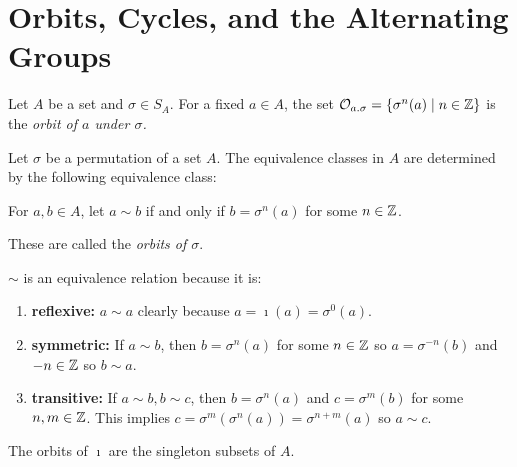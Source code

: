 \section{Orbits, Cycles, and the Alternating Groups}

\begin{definition}
    Let $A$ be a set and $\sigma \in S_A$. For a fixed $a \in A$, the set $\mathcal{O}_{a.\sigma}=\{\sigma^n(a)\mid n\in\mathbb{Z}\}$ is the \emph{orbit of $a$ under $\sigma$.}
\end{definition}
\begin{remark}
    Let $\sigma$ be a permutation of a set $A$. The equivalence classes in $A$ are determined by the following equivalence class:
    \begin{center}
        For $a,b \in A$, let $a\sim b$ if and only if $b = \sigma^n(a)$ for some $n \in \mathbb{Z}$.
    \end{center}
    These are called the \emph{orbits of $\sigma$}.
\end{remark}
\begin{explanation}
    $\sim$ is an equivalence relation because it is:
    \begin{enumerate}
        \item \textbf{reflexive:} $a\sim a$ clearly because $a=\imath(a)=\sigma^0(a)$.
        \item \textbf{symmetric:} If $a \sim b$, then $b = \sigma^n(a)$ for some $n \in \mathbb{Z}$ so $a = \sigma^{-n}(b)$ and $-n \in \mathbb{Z}$ so $b\sim a$.
        \item \textbf{transitive:} If $a \sim b, b \sim c$, then $b = \sigma^n(a)$ and $c = \sigma^m(b)$ for some $n,m \in \mathbb{Z}$. This implies $c = \sigma^m(\sigma^n(a)) = \sigma^{n+m}(a)$ so $a \sim c$.
    \end{enumerate}
\end{explanation}
\begin{example}
    The orbits of $\imath$ are the singleton subsets of $A$.
\end{example}
